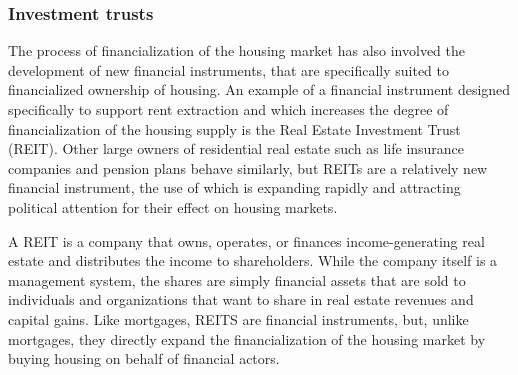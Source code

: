 

\subsubsection{Investment trusts}

The process of financialization of the housing market has also involved the development of new financial instruments, that are specifically suited to financialized ownership of housing. An example of a financial instrument designed specifically to support rent extraction and which increases the degree of financialization of the housing supply is the Real Estate Investment Trust (\gls{REIT}). Other large owners of residential real estate such as life insurance companies and pension plans behave similarly, but REITs are a relatively new financial instrument, the use of which is expanding rapidly and attracting political attention for their effect on housing markets.

A REIT is a company that owns, operates, or finances income-generating real estate and distributes the income to shareholders. While the company itself is a management system, the shares are simply financial assets that are sold to individuals and organizations that want to share in real estate revenues and capital gains. Like mortgages, REITS are financial instruments, but, unlike mortgages, they directly expand the financialization of the housing market by buying housing on behalf of financial actors.

